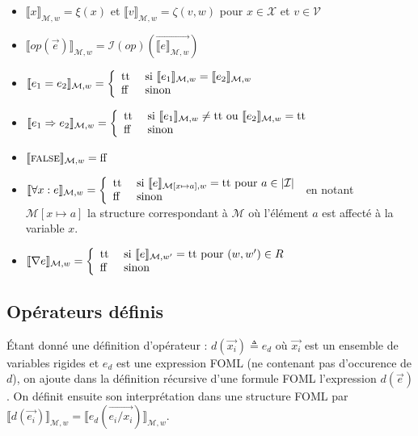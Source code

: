 \documentclass[12pt]{article}
\newcommand{\false}{\textup{ff}}
\newcommand{\true}{\textup{tt}}
\newcommand{\M}{\ensuremath{\mathcal{M}}}
\newcommand{\I}{\ensuremath{\mathcal{I}}}
\newcommand{\FALSE}{\textsc{false}}
\begin{document}
\begin{itemize}
\item
  $\llbracket x \rrbracket_{\M, w} = \xi(x)$ et $\llbracket v \rrbracket_{\M, w} = \zeta(v, w)$ pour $x \in \mathcal{X}$ et $v \in \mathcal{V}$
\item
  $\llbracket op(\vec{e}) \rrbracket_{\M, w} = \I(op)(\vec{\llbracket e \rrbracket_{\M, w}})$
\item
  $\llbracket e_1 = e_2 \rrbracket_{\M, w} = \left \{
\begin{array}{l l}
  \true & \textup{ si } \llbracket e_1 \rrbracket_{\M, w} = \llbracket e_2 \rrbracket_{\M, w} \\
  \false & \textup{ sinon }
\end{array} \right .$
\item
  $\llbracket e_1 \Rightarrow e_2 \rrbracket_{\M, w} = \left \{
\begin{array}{l l}
  \true & \textup{ si } \llbracket e_1 \rrbracket_{\M, w} \neq \true \textup{ ou }
          \llbracket e_2 \rrbracket_{\M, w} = \true \\
  \false & \textup{ sinon }
\end{array} \right .$
\item
  $\llbracket \FALSE \rrbracket_{\M, w} = \false$
\item
  $\llbracket \forall x : e \rrbracket_{\M, w} = \left \{
\begin{array}{l l}
  \true & \textup{ si } \llbracket e \rrbracket_{\M[x \mapsto a], w} = \true \textup{ pour } a \in |\I| \\
  \false & \textup{ sinon }
\end{array} \right .$
en notant $\M[x \mapsto a]$ la structure correspondant à $\M$ où l'élément $a$ est affecté à la variable $x$.
\item
  $\llbracket \nabla e \rrbracket_{\M, w} = \left \{
\begin{array}{l l}
  \true & \textup{ si } \llbracket e \rrbracket_{\M, w'} = \true \textup{ pour } (w, w') \in R \\
  \false & \textup{ sinon }
\end{array} \right .$
\end{itemize}

\subsection{Opérateurs définis}

Étant donné une définition d'opérateur : $d(\vec{x_i}) \triangleq e_d$ où $\vec{x_i}$ est un ensemble de variables rigides et $e_d$ est une expression FOML (ne contenant pas d'occurence de $d$), on ajoute dans la définition récursive d'une formule FOML l'expression $d(\vec{e})$.
On définit ensuite son interprétation dans une structure FOML par $\llbracket d(\vec{e_i}) \rrbracket_{\M, w} = \llbracket e_d(\vec{e_i/x_i}) \rrbracket_{\M, w}$.
\end{document}
